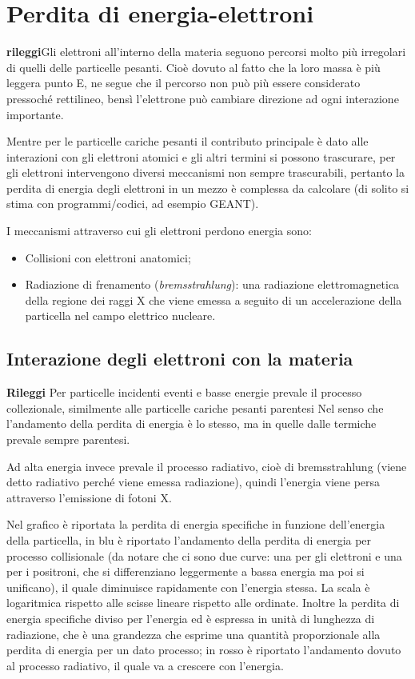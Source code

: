 \section{Perdita di energia-elettroni}

\textbf{rileggi}Gli elettroni all'interno della materia seguono percorsi molto più irregolari di quelli delle particelle pesanti. Cioè dovuto al fatto che la loro massa è più leggera punto E, ne segue che il percorso non può più essere considerato pressoché rettilineo, bensì l'elettrone può cambiare direzione ad ogni interazione importante.

Mentre per le particelle cariche pesanti il contributo principale è dato alle interazioni con gli elettroni atomici e gli altri termini si possono trascurare, per gli elettroni intervengono diversi meccanismi non sempre trascurabili, pertanto la perdita di energia degli elettroni in un mezzo è complessa da calcolare (di solito si stima con programmi/codici, ad esempio GEANT).

I meccanismi attraverso cui gli elettroni perdono energia sono:

\begin{itemize}
    \item Collisioni con elettroni anatomici;
    \item Radiazione di frenamento (\textit{bremsstrahlung}): una radiazione elettromagnetica della regione dei raggi X che viene emessa a seguito di un accelerazione della particella nel campo elettrico nucleare.
\end{itemize}

\subsection{Interazione degli elettroni con la materia}

\textbf{Rileggi}
Per particelle incidenti eventi e basse energie prevale il processo collezionale, similmente alle particelle cariche pesanti parentesi Nel senso che l'andamento della perdita di energia è lo stesso, ma in quelle dalle termiche prevale sempre parentesi.

Ad alta energia invece prevale il processo radiativo, cioè di bremsstrahlung (viene detto radiativo perché viene emessa radiazione), quindi l'energia viene persa attraverso l'emissione di fotoni X.

Nel grafico è riportata la perdita di energia specifiche in funzione dell'energia della particella, in blu è riportato l'andamento della perdita di energia per processo collisionale (da notare che ci sono due curve: una per gli elettroni e una per i positroni, che si differenziano leggermente a bassa energia ma poi si unificano), il quale diminuisce rapidamente con l'energia stessa. La scala è logaritmica rispetto alle scisse lineare rispetto alle ordinate. Inoltre la perdita di energia specifiche diviso per l'energia ed è espressa in unità di lunghezza di radiazione, che è una grandezza che esprime una quantità proporzionale alla perdita di energia per un dato processo; in rosso è riportato l'andamento dovuto al processo radiativo, il quale va a crescere con l'energia.

